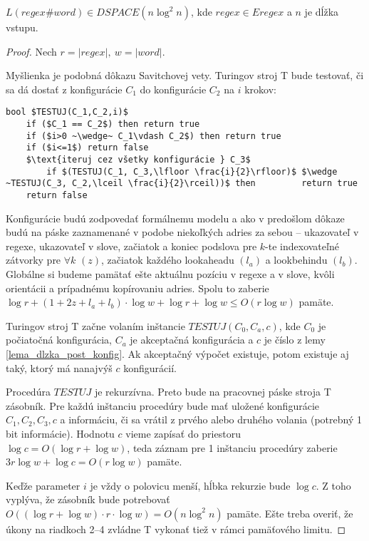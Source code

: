 \documentclass{svk_long_sk}
\def\e{Eregex}
\begin{document}
\begin{theorem}\label{regexword_dspace}
$L(regex\#word) \in DSPACE(n \log^2 n)$, kde $regex \in \e$ a $n$ je dĺžka vstupu.
\end{theorem}
\begin{proof} 
Nech $r=|regex|,~w=|word|$.

Myšlienka je podobná dôkazu Savitchovej vety\cite{Savitch_skripta}. Turingov stroj T bude testovať, či sa dá dostať z konfigurácie $C_1$ do konfigurácie $C_2$ na $i$ krokov:
\begin{lstlisting}[mathescape]
bool $TESTUJ(C_1,C_2,i)$
	if ($C_1 == C_2$) then return true
	if ($i>0 ~\wedge~ C_1\vdash C_2$) then return true
	if ($i<=1$) return false
	$\text{iteruj cez všetky konfigurácie } C_3$
		if $(TESTUJ(C_1, C_3,\lfloor \frac{i}{2}\rfloor)$ $\wedge ~TESTUJ(C_3, C_2,\lceil \frac{i}{2}\rceil))$ then 		return true
	return false
\end{lstlisting}
Konfigurácie budú zodpovedať formálnemu modelu a ako v predošlom dôkaze budú na páske zaznamenané v podobe niekoľkých adries za sebou -- ukazovateľ v regexe, ukazovateľ v slove, začiatok a koniec podslova pre $k$-te indexovateľné zátvorky pre $\forall k$ $(z)$, začiatok každého lookaheadu $(l_a)$ a lookbehindu $(l_b)$. Globálne si budeme pamätať ešte aktuálnu pozíciu v regexe a v slove, kvôli orientácii a prípadnému kopírovaniu adries. Spolu to zaberie $\log r+(1+2z+l_a+l_b)\cdot \log w + \log r+\log w \leq O(r\log w)$ pamäte.

Turingov stroj T začne volaním inštancie $TESTUJ(C_0,C_a,c)$, kde $C_0$ je počiatočná konfigurácia, $C_a$ je akceptačná konfigurácia a $c$ je číslo z lemy \ref{lema_dlzka_post_konfig}. Ak akceptačný výpočet existuje, potom existuje aj taký, ktorý má nanajvýš $c$ konfigurácií.

Procedúra $TESTUJ$ je rekurzívna. Preto bude na pracovnej páske stroja T zásobník. Pre každú inštanciu procedúry bude mať uložené konfigurácie $C_1, C_2, C_3, c$ a informáciu, či sa vrátil z prvého alebo druhého volania (potrebný 1 bit informácie). Hodnotu $c$ vieme zapísať do priestoru $\log c = O(\log r + \log w)$, teda záznam pre 1 inštanciu procedúry zaberie $3r\log w + \log c = O(r\log w)$ pamäte. 

Keďže parameter $i$ je vždy o polovicu menší, hĺbka rekurzie bude $\log c$. Z toho vyplýva, že zásobník bude potrebovať $O((\log r + \log w)\cdot r\cdot \log w) = O(n\log^2n)$ pamäte. Ešte treba overiť, že úkony na riadkoch 2--4 zvládne T vykonať tiež v rámci pamäťového limitu.


\end{proof}
\end{document}
